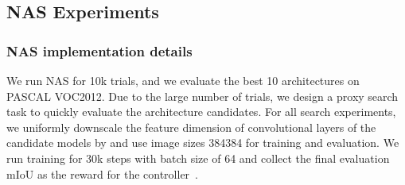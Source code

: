 \documentclass[10pt,twocolumn,letterpaper]{article}
\begin{document}
\subsection{NAS Experiments}
\subsubsection{NAS implementation details}
We run NAS for 10k trials, and we evaluate the best 10 architectures on PASCAL VOC2012. Due to the large number of trials, we design a proxy search task to quickly evaluate the architecture candidates. For all search experiments, we uniformly downscale the feature dimension of convolutional layers of the candidate models by  and use image sizes 384384 for training and evaluation. We run training for 30k steps with batch size of 64 and collect the final evaluation mIoU as the reward for the controller~\cite{nas}.
\end{document}
